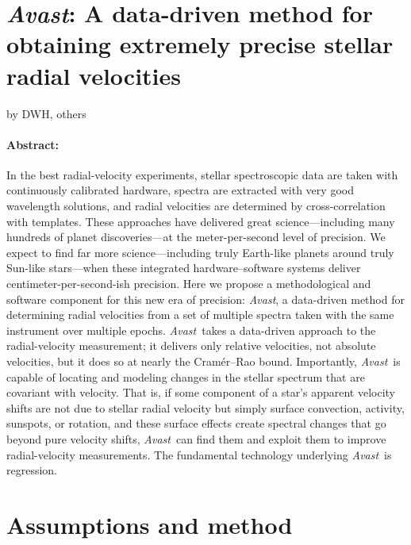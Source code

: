 \documentclass[12pt, letterpaper]{article}
\newcommand{\project}[1]{\textsl{#1}}
\newcommand{\Avast}{\project{Avast}}
\begin{document}
\section*{\Avast: A data-driven method for obtaining extremely precise stellar radial velocities}

\noindent
by DWH, others

\paragraph{Abstract:}
In the best radial-velocity experiments, stellar
spectroscopic data are taken with continuously calibrated hardware,
spectra are extracted with very good wavelength solutions, and radial
velocities are determined by cross-correlation with templates.
These approaches have delivered great science---including many
hundreds of planet discoveries---at the meter-per-second level of
precision.
We expect to find far more science---including truly Earth-like
planets around truly Sun-like stars---when these integrated
hardware--software systems deliver centimeter-per-second-ish
precision.
Here we propose a methodological and software component for this new
era of precision: \Avast, a data-driven method for determining
radial velocities from a set of multiple spectra taken with the same
instrument over multiple epochs.
\Avast\ takes a data-driven approach to the radial-velocity
measurement; it delivers only relative velocities, not absolute
velocities, but it does so at nearly the Cram\'er--Rao bound.
Importantly, \Avast\ is capable of locating and modeling changes in
the stellar spectrum that are covariant with velocity.
That is, if some component of a star's apparent velocity shifts are
not due to stellar radial velocity but simply surface convection,
activity, sunspots, or rotation, and these surface effects create
spectral changes that go beyond pure velocity shifts, \Avast\ can find
them and exploit them to improve radial-velocity measurements.
The fundamental technology underlying \Avast\ is regression.

\section{Assumptions and method}
\end{document}
